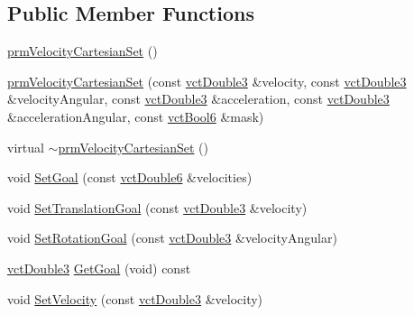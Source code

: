 \subsection*{Public Member Functions}
\begin{DoxyCompactItemize}
\item 
\hyperlink{classprm_velocity_cartesian_set_ada468c087b329d4c9ba1b6eb431cf468}{prm\-Velocity\-Cartesian\-Set} ()
\item 
\hyperlink{classprm_velocity_cartesian_set_a52e3f562a76cdc54e5622b3e245949ea}{prm\-Velocity\-Cartesian\-Set} (const \hyperlink{vct_fixed_size_vector_types_8h_a4a89122c9d7f72c3f31fe8126e17c3af}{vct\-Double3} \&velocity, const \hyperlink{vct_fixed_size_vector_types_8h_a4a89122c9d7f72c3f31fe8126e17c3af}{vct\-Double3} \&velocity\-Angular, const \hyperlink{vct_fixed_size_vector_types_8h_a4a89122c9d7f72c3f31fe8126e17c3af}{vct\-Double3} \&acceleration, const \hyperlink{vct_fixed_size_vector_types_8h_a4a89122c9d7f72c3f31fe8126e17c3af}{vct\-Double3} \&acceleration\-Angular, const \hyperlink{vct_fixed_size_vector_types_8h_a1494a41869ce763813f2bf7f922b8fdd}{vct\-Bool6} \&mask)
\item 
virtual \hyperlink{classprm_velocity_cartesian_set_a036fd1bb9d1576378c48a23ae67f2db9}{$\sim$prm\-Velocity\-Cartesian\-Set} ()
\item 
void \hyperlink{classprm_velocity_cartesian_set_afd7e1b4306895c315a68c5ce7c8cba68}{Set\-Goal} (const \hyperlink{vct_fixed_size_vector_types_8h_a26a80e4d58f1201f2bfc347f4ac81bf8}{vct\-Double6} \&velocities)
\item 
void \hyperlink{classprm_velocity_cartesian_set_a144bfc61303b8f33a801fe9f22d2100b}{Set\-Translation\-Goal} (const \hyperlink{vct_fixed_size_vector_types_8h_a4a89122c9d7f72c3f31fe8126e17c3af}{vct\-Double3} \&velocity)
\item 
void \hyperlink{classprm_velocity_cartesian_set_aba3a6db1c99578c649ccbeb026aed140}{Set\-Rotation\-Goal} (const \hyperlink{vct_fixed_size_vector_types_8h_a4a89122c9d7f72c3f31fe8126e17c3af}{vct\-Double3} \&velocity\-Angular)
\item 
\hyperlink{vct_fixed_size_vector_types_8h_a4a89122c9d7f72c3f31fe8126e17c3af}{vct\-Double3} \hyperlink{classprm_velocity_cartesian_set_a9a00a6b4358e34abf38ebdb9360b8a2f}{Get\-Goal} (void) const 
\item 
void \hyperlink{classprm_velocity_cartesian_set_a7fbb5ad16bacd715db32b43ee6f29064}{Set\-Velocity} (const \hyperlink{vct_fixed_size_vector_types_8h_a4a89122c9d7f72c3f31fe8126e17c3af}{vct\-Double3} \&velocity)

\end{DoxyCompactItemize}
